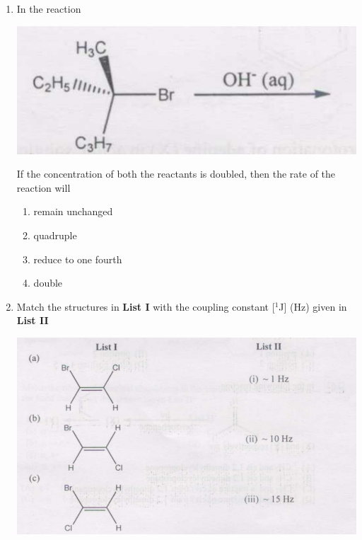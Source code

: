 \documentclass[journal,12pt,onecolumn]{IEEEtran}
\theoremstyle{remark}
\begin{document}
\begin{enumerate}
\begin{multicols}{2}
\begin{enumerate}
     \item   Y < X < Z
     \item   Y < Z < X
     \item   X < Z < Y
     \item   X < Y < Z
\end{enumerate}
\end{multicols}

  

\item  In the reaction \hfill{}

\includegraphics[scale=0.75]{figs/image2.png}

If the concentration of both the reactants is doubled, then the rate of the reaction will

\begin{multicols}{2}
\begin{enumerate}
     \item   remain unchanged
     \item   quadruple
     \item   reduce to one fourth
     \item   double
\end{enumerate}
\end{multicols}

  

\item  Match the structures in \textbf{List I} with the coupling constant [$^1$J] (Hz) given in \textbf{List II} \hfill{}

\includegraphics[scale=0.75]{figs/image3.png}


\end{enumerate}
\end{document}
